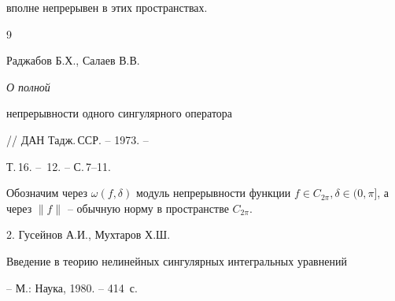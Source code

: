 вполне непрерывен в этих пространствах.





\begin{thebibliography}{9}







Раджабов Б.Х., Салаев В.В. {\em О полной


непрерывности одного сингулярного оператора}


// ДАН Тадж.\,ССР. -- 1973. --


Т.\,16. -- \No\,12. -- С.\,7--11.





\end{thebibliography}





\vskip 2cm












\label{end}























Обозначим через $\omega(f,\delta)$ модуль непрерывности функции $f\in C_{2\pi},


\delta \in (0,\pi]$, а через $\|f\|$ -- обычную норму в пространстве $C_{2\pi}$.








2. {\curs Гусейнов А.И., Мухтаров Х.Ш.\/}


{\norm Введение в теорию нелинейных сингулярных интегральных уравнений


-- М.: Наука, 1980. -- 414~с.}




















